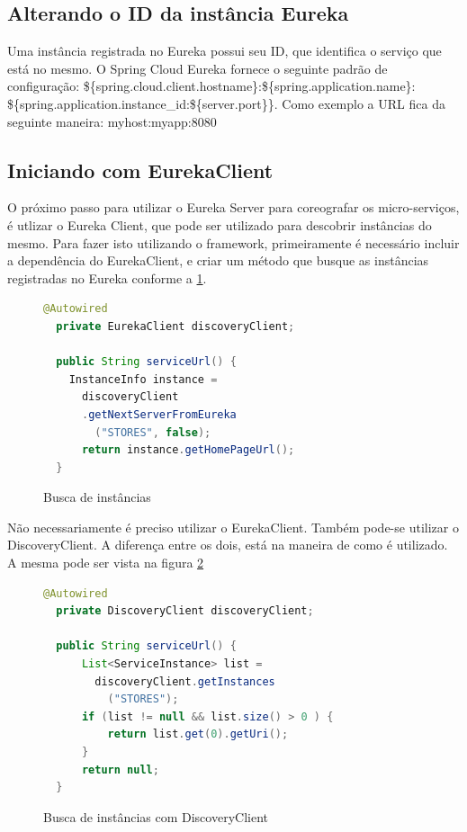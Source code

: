 \documentclass[journal]{IEEEtran}
\begin{document}
\subsection{Alterando o ID da instância Eureka}

Uma instância registrada no Eureka possui seu ID, que identifica o serviço que está no mesmo. O Spring Cloud Eureka fornece o seguinte padrão de configuração: \$\{spring.cloud.client.hostname\}:\$\{spring.application.name\}:
\$\{spring.application.instance\_id:\$\{server.port\}\}. Como exemplo a URL fica da seguinte maneira: myhost:myapp:8080

\subsection{Iniciando com EurekaClient}

O próximo passo para utilizar o Eureka Server para coreografar os micro-serviços, é utlizar o Eureka Client, que pode ser utilizado para descobrir instâncias do mesmo. Para fazer isto utilizando o framework, primeiramente é necessário incluir a dependência do EurekaClient, e criar um método que busque as instâncias registradas no Eureka conforme a \ref{alg:figuraquatro}.


\begin{figure}[h]
\centering

\begin{lstlisting}[language=Java]
  @Autowired
  private EurekaClient discoveryClient;

  public String serviceUrl() {
    InstanceInfo instance = 
      discoveryClient
      .getNextServerFromEureka
        ("STORES", false);
      return instance.getHomePageUrl();
  } 
\end{lstlisting}

\caption{Busca de instâncias}
\label{alg:figuraquatro}
\end{figure}

Não necessariamente é preciso utilizar o EurekaClient. Também pode-se utilizar o DiscoveryClient. A diferença entre os dois, está na maneira de como é utilizado. A mesma pode ser vista na figura \ref{alg:figuracinco}

\begin{figure}[h]
\centering

\begin{lstlisting}[language=Java]
  @Autowired
  private DiscoveryClient discoveryClient;

  public String serviceUrl() {
      List<ServiceInstance> list = 
        discoveryClient.getInstances
          ("STORES");
      if (list != null && list.size() > 0 ) {
          return list.get(0).getUri();
      }
      return null;
  }
\end{lstlisting}

\caption{Busca de instâncias com DiscoveryClient}
\label{alg:figuracinco}
\end{figure}
\end{document}
